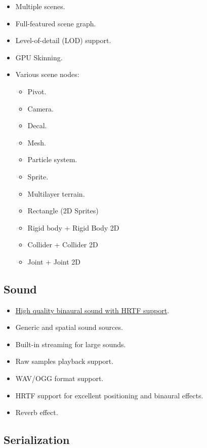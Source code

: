 \documentclass[
]{book}
\providecommand{\tightlist}{%
  \setlength{\itemsep}{0pt}\setlength{\parskip}{0pt}}
\theoremstyle{definition}
\theoremstyle{definition}
\theoremstyle{definition}
\theoremstyle{definition}
\theoremstyle{remark}
\begin{document}
\begin{itemize}
\tightlist
\item
  Multiple scenes.
\item
  Full-featured scene graph.
\item
  Level-of-detail (LOD) support.
\item
  GPU Skinning.
\item
  Various scene nodes:

  \begin{itemize}
  \tightlist
  \item
    Pivot.
  \item
    Camera.
  \item
    Decal.
  \item
    Mesh.
  \item
    Particle system.
  \item
    Sprite.
  \item
    Multilayer terrain.
  \item
    Rectangle (2D Sprites)
  \item
    Rigid body + Rigid Body 2D
  \item
    Collider + Collider 2D
  \item
    Joint + Joint 2D
  \end{itemize}
\end{itemize}

\subsection{Sound}\label{sound}

\begin{itemize}
\tightlist
\item
  \href{https://github.com/FyroxEngine/Fyrox/tree/master/fyrox-sound}{High quality binaural sound with HRTF support}.
\item
  Generic and spatial sound sources.
\item
  Built-in streaming for large sounds.
\item
  Raw samples playback support.
\item
  WAV/OGG format support.
\item
  HRTF support for excellent positioning and binaural effects.
\item
  Reverb effect.
\end{itemize}

\subsection{Serialization}\label{serialization}
\end{document}
